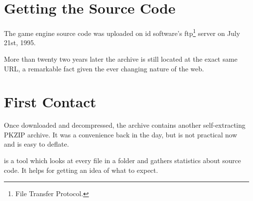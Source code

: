 \documentclass[book.tex]{subfiles}
\begin{document}
\section{Getting the Source Code}
The game engine source code was uploaded on id software's ftp\footnote{File Transfer Protocol.} server on July 21st, 1995.\\ 
\par
\begin{minipage}{\textwidth}

\end{minipage}
\par
More than twenty two years later the archive is still located at the exact same URL, a remarkable fact given the ever changing nature of the web.\\

\section{First Contact}
Once downloaded and decompressed, the archive  contains another self-extracting PKZIP archive. It was a convenience back in the day, but is not practical now and is easy to deflate.\\
\par
\begin{minipage}{\textwidth}

\end{minipage}

\par
{} is a tool which looks at every file in a folder and gathers statistics about source code. It helps for getting an idea of what to expect.\\
\par

\begin{minipage}{\textwidth}

\end{minipage}
\end{document}
